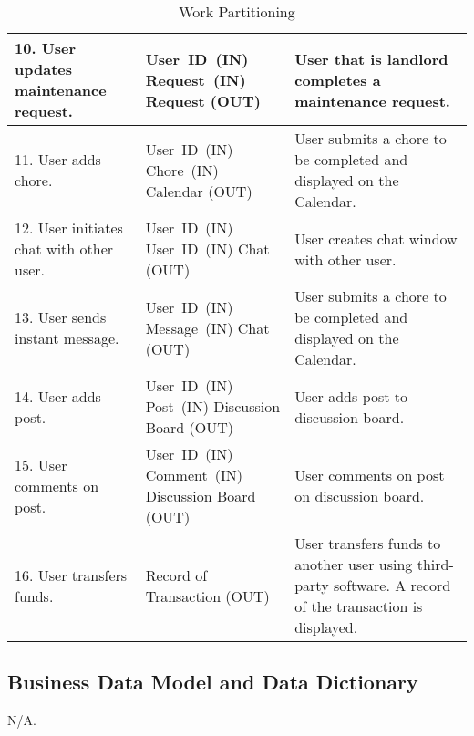 \documentclass[12pt, titlepage]{article}
\begin{document}
\begin{table}
\begin{tabular}{|p{5cm}|p{5cm}|p{5cm}|}
\hline
10. User updates maintenance request. & \mbox{User ID (IN)} \linebreak \mbox{Request (IN)} \linebreak Request (OUT) & User that is landlord completes a maintenance request. \\
\hline
11. User adds chore. & \mbox{User ID (IN)} \linebreak \mbox{Chore (IN)} \linebreak Calendar (OUT) & User submits a chore to be completed and displayed on the Calendar. \\
\hline
12. User initiates chat with other user. & \mbox{User ID (IN)} \linebreak \mbox{User ID (IN)} \linebreak Chat (OUT) & User creates chat window with other user. \\
\hline
13. User sends instant message. & \mbox{User ID (IN)} \linebreak \mbox{Message (IN)} \linebreak Chat (OUT) & User submits a chore to be completed and displayed on the Calendar. \\
\hline
14. User adds post. & \mbox{User ID (IN)} \linebreak \mbox{Post (IN)} \linebreak Discussion Board (OUT) & User adds post to discussion board. \\
\hline
15. User comments on post. & \mbox{User ID (IN)} \linebreak \mbox{Comment (IN)} \linebreak Discussion Board (OUT) & User comments on post on discussion board. \\
\hline
16. User transfers funds. & Record of Transaction (OUT) & User transfers funds to another user using third-party software. A record of the transaction is displayed. \\
\hline
\end{tabular}
\caption{Work Partitioning}
\end{table}

\subsection{Business Data Model and Data Dictionary}
N/A.
\end{document}
